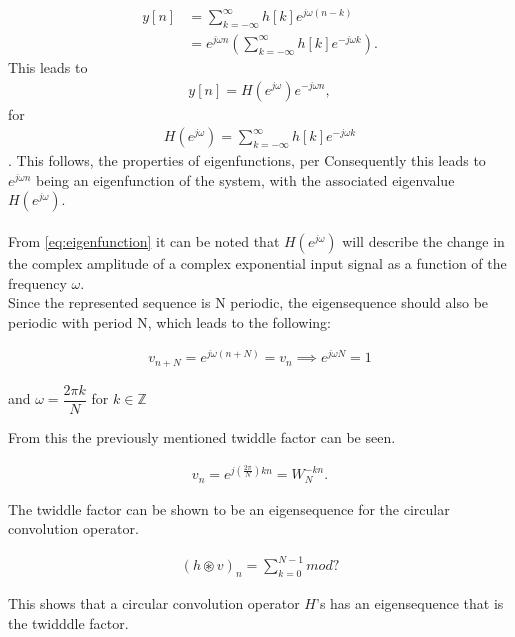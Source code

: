\begin{align*}
y[n] 
&= \sum_{k=-\infty}^{\infty} h[k]e^{j\omega(n-k)} \nonumber \\ 
&= e^{j\omega n} \left(\sum_{k=-\infty}^{\infty} h[k]e^{-j\omega k} \right).
\end{align*}
This leads to
\begin{align}\label{eq:eigenfunction}
y[n] = H(e^{j \omega}) e^{-j\omega n},
\end{align}
for
\begin{align*}
H(e^{j\omega}) = \sum_{k=-\infty}^{\infty} h[k]e^{-j\omega k} 
\end{align*}.
This follows, the properties of eigenfunctions, per 
Consequently this leads to $e^{j\omega n}$ being an eigenfunction of the system, with the associated eigenvalue $H(e^{j\omega})$.
\\\\
From \eqref{eq:eigenfunction} it can be noted that $H(e^{j\omega})$ will describe the change in the complex amplitude of a complex exponential input signal as a function of the frequency $\omega$. \cite{DTSP} 
\\
Since the represented sequence is N periodic, the eigensequence should also be periodic with period N, which leads to the following:

\begin{align*}
	v_{n+N} = e^{j\omega (n+N)} = v_n \implies e^{j\omega N} = 1
\end{align*}

and $\omega = \dfrac{2 \pi k}{N}$ for $k \in \mathbb{Z}$

From this the previously mentioned twiddle factor can be seen.

\begin{align*}
	v_n = e^{j(\frac{2\pi}{N}) kn} = W_N^{-kn}.
\end{align*}\cite{FSP}

The twiddle factor can be shown to be an eigensequence for the circular convolution operator.

\begin{align*}
	(h\circledast v)_n = \sum_{k=0}^{N-1} mod?
\end{align*}

This shows that a circular convolution operator $H$'s has an eigensequence that is the twidddle factor.